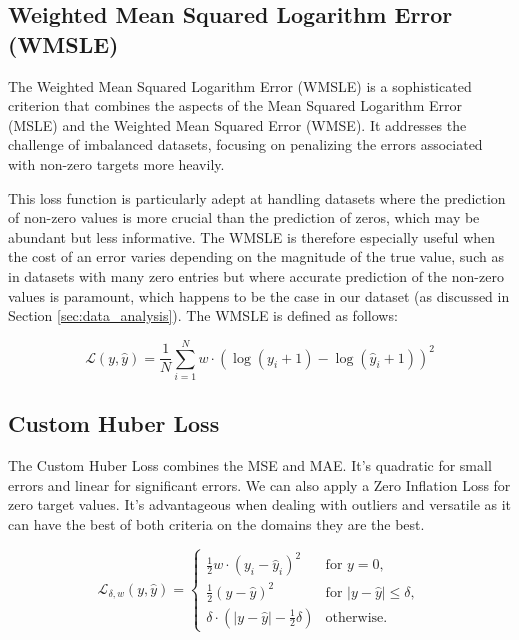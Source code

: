 \subsection{Weighted Mean Squared Logarithm Error (WMSLE)}

The Weighted Mean Squared Logarithm Error (\gls{WMSLE}) is a sophisticated criterion that combines the aspects of the Mean Squared Logarithm Error (\gls{MSLE}) and the Weighted Mean Squared Error (\gls{WMSE}). It addresses the challenge of imbalanced datasets, focusing on penalizing the errors associated with non-zero targets more heavily.

This loss function is particularly adept at handling datasets where the prediction of non-zero values is more crucial than the prediction of zeros, which may be abundant but less informative. The \gls{WMSLE} is therefore especially useful when the cost of an error varies depending on the magnitude of the true value, such as in datasets with many zero entries but where accurate prediction of the non-zero values is paramount, which happens to be the case in our dataset (as discussed in Section \ref{sec:data_analysis}). The \gls{WMSLE} is defined as follows:

\begin{equation}
\mathcal{L}(y, \hat{y}) = \frac{1}{N} \sum_{i=1}^{N} w \cdot (\log(y_i + 1) - \log(\hat{y}_i + 1))^2
\end{equation}


\subsection{Custom Huber Loss}

The Custom Huber Loss combines the \gls{MSE} and \gls{MAE}. It's quadratic for small errors and linear for significant errors. We can also apply a Zero Inflation Loss for zero target values. It's advantageous when dealing with outliers and versatile as it can have the best of both criteria on the domains they are the best.

\begin{equation}
\mathcal{L}_{\delta, w}(y, \hat{y}) = 
\begin{cases} 
\frac{1}{2} w \cdot (y_i - \hat{y}_i)^2 & \text{for } y =0, \\
\frac{1}{2} (y - \hat{y})^2 & \text{for } |y - \hat{y}| \leq \delta, \\
\delta \cdot (|y - \hat{y}| - \frac{1}{2} \delta) & \text{otherwise.}
\end{cases}
\end{equation}


